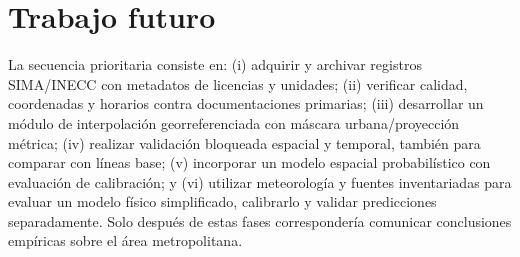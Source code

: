 \section{Trabajo futuro}
La secuencia prioritaria consiste en: (i) adquirir y archivar registros SIMA/INECC con metadatos de licencias y unidades; (ii) verificar calidad, coordenadas y horarios contra documentaciones primarias; (iii) desarrollar un módulo de interpolación georreferenciada con máscara urbana/proyección métrica; (iv) realizar validación bloqueada espacial y temporal, también para comparar con líneas base; (v) incorporar un modelo espacial probabilístico con evaluación de calibración; y (vi) utilizar meteorología y fuentes inventariadas para evaluar un modelo físico simplificado, calibrarlo y validar predicciones separadamente. Solo después de estas fases correspondería comunicar conclusiones empíricas sobre el área metropolitana.
